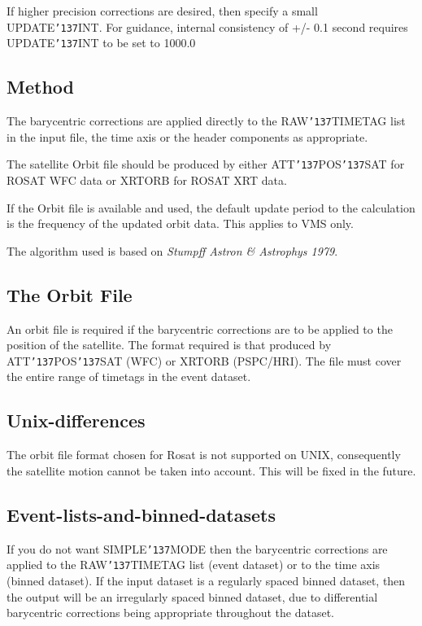 \documentclass{book}
\renewcommand{\_}{{\tt\char'137}}     %
\begin{document}
If higher precision corrections are desired, then specify a small
UPDATE\_INT. For guidance, internal consistency of +/- 0.1 second
requires UPDATE\_INT to be set to 1000.0
 
\subsection{Method}
The barycentric corrections are applied directly to the RAW\_TIMETAG
list in the input file, the time axis or the header components as
appropriate.
 
The satellite Orbit file should be produced by either
ATT\_POS\_SAT for ROSAT WFC data or XRTORB for ROSAT XRT data.
 
If the Orbit file is available and used, the default update
period to the calculation is the frequency of the updated
orbit data. This applies to VMS only.
 
The algorithm used is based on {\em Stumpff Astron \& Astrophys 1979}.
\subsection{The Orbit File}
An orbit file is required if the barycentric corrections are to be
applied to the position of the satellite. The format required is
that produced by ATT\_POS\_SAT (WFC) or XRTORB (PSPC/HRI).
The file must cover the entire range of timetags in the event dataset.
 
\subsection{Unix-differences}
The orbit file format chosen for Rosat is not supported on UNIX,
consequently the satellite motion cannot be taken into account.
This will be fixed in the future.
 
\subsection{Event-lists-and-binned-datasets}
If you do not want SIMPLE\_MODE then the barycentric corrections are
applied to the RAW\_TIMETAG list (event dataset) or to the time axis
(binned dataset). If the input dataset is a regularly spaced binned
dataset, then the output will be an irregularly spaced binned dataset,
due to differential barycentric corrections being appropriate
throughout the dataset.
 
\end{document}
